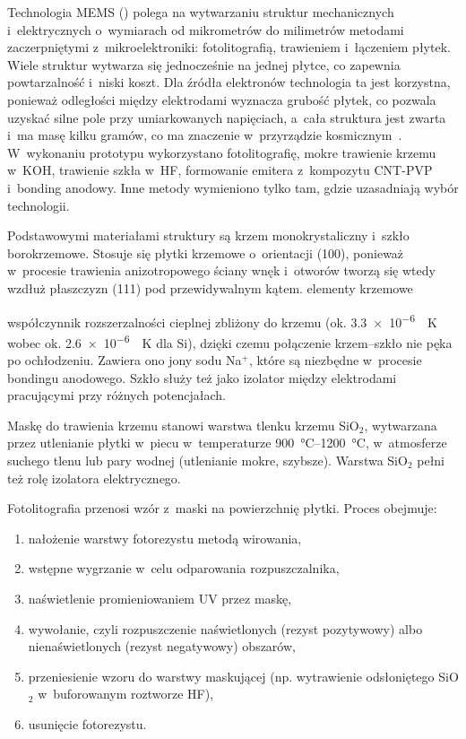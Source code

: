 \begin{zmiana}
Technologia MEMS () polega
na wytwarzaniu struktur mechanicznych i~elektrycznych o~wymiarach od
mikrometrów do milimetrów metodami zaczerpniętymi z~mikroelektroniki:
fotolitografią, trawieniem i~łączeniem płytek. Wiele struktur wytwarza
się jednocześnie na jednej płytce, co zapewnia powtarzalność i~niski
koszt. Dla źródła elektronów technologia ta jest korzystna, ponieważ
odległości między elektrodami wyznacza grubość płytek, co pozwala uzyskać
silne pole przy umiarkowanych napięciach, a~cała struktura jest zwarta
i~ma masę kilku gramów, co ma znaczenie w~przyrządzie
kosmicznym~\cite{urbanski2026phd}. W~wykonaniu prototypu wykorzystano
fotolitografię, mokre trawienie krzemu w~KOH, trawienie szkła w~HF,
formowanie emitera z~kompozytu CNT-PVP i~bonding anodowy. Inne metody
wymieniono tylko tam, gdzie uzasadniają wybór technologii.
\end{zmiana}

Podstawowymi materiałami struktury są krzem monokrystaliczny i~szkło
borokrzemowe. Stosuje się płytki krzemowe o~orientacji (100), ponieważ
w~procesie trawienia anizotropowego ściany wnęk i~otworów tworzą się
wtedy wzdłuż płaszczyzn (111) pod przewidywalnym kątem.
 elementy krzemowe 

 współczynnik
rozszerzalności cieplnej zbliżony do krzemu (ok.
\SI{3.3e-6}{\per\kelvin} wobec ok. \SI{2.6e-6}{\per\kelvin} dla Si),
dzięki czemu połączenie krzem--szkło nie pęka po ochłodzeniu.
Zawiera ono jony sodu Na$^+$, które są niezbędne w~procesie bondingu
anodowego. Szkło służy też jako izolator
między elektrodami pracującymi przy różnych potencjałach.

Maskę do trawienia krzemu stanowi warstwa tlenku krzemu SiO$_2$,
wytwarzana przez utlenianie płytki w~piecu w~temperaturze
\SIrange{900}{1200}{\celsius}, w~atmosferze suchego tlenu lub pary
wodnej (utlenianie mokre, szybsze). Warstwa SiO$_2$ pełni też rolę
izolatora elektrycznego.

Fotolitografia przenosi wzór z~maski na powierzchnię płytki. Proces
obejmuje:
\begin{enumerate}
  \item nałożenie warstwy fotorezystu metodą wirowania,
  \item wstępne wygrzanie w~celu odparowania rozpuszczalnika,
  \item naświetlenie promieniowaniem UV przez maskę,
  \item wywołanie, czyli rozpuszczenie naświetlonych (rezyst pozytywowy)
        albo nienaświetlonych (rezyst negatywowy) obszarów,
  \item przeniesienie wzoru do warstwy maskującej (np. wytrawienie
        odsłoniętego SiO$_2$ w~buforowanym roztworze HF),
  \item usunięcie fotorezystu.
\end{enumerate}

